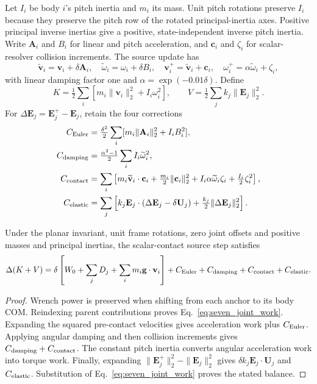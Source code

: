 Let $I_i$ be body $i$'s pitch inertia and $m_i$ its mass.
Unit pitch rotations preserve $I_i$ because they preserve the pitch row of the rotated principal-inertia axes.
Positive principal inverse inertias give a positive, state-independent inverse pitch inertia.
Write $\mathbf A_i$ and $B_i$ for linear and pitch acceleration, and $\mathbf c_i$ and $\zeta_i$ for scalar-resolver collision increments.
The source update has
\begin{equation}
 \widetilde{\mathbf v}_i=\mathbf v_i+\delta\mathbf A_i,\quad
 \widetilde\omega_i=\omega_i+\delta B_i,\quad
 \mathbf v_i^+=\widetilde{\mathbf v}_i+\mathbf c_i,\quad
 \omega_i^+=\alpha\widetilde\omega_i+\zeta_i,
\end{equation}
with linear damping factor one and $\alpha=\exp(-0.01\delta)$.
Define
\begin{equation}
 K=\tfrac12\sum_i[m_i\|\mathbf v_i\|_2^2+I_i\omega_i^2],
 \qquad V=\tfrac12\sum_jk_j\|\mathbf E_j\|_2^2.
\end{equation}
For $\Delta\mathbf E_j=\mathbf E_j^+-\mathbf E_j$, retain the four corrections
\begin{align}
 C_{\rm Euler}&=\tfrac{\delta^2}{2}\sum_i[m_i\|\mathbf A_i\|_2^2+I_iB_i^2],\nonumber\\
 C_{\rm damping}&=\tfrac{\alpha^2-1}{2}\sum_iI_i\widetilde\omega_i^2,\nonumber\\
 C_{\rm contact}&=\sum_i\left[
 m_i\widetilde{\mathbf v}_i\cdot\mathbf c_i+\tfrac{m_i}{2}\|\mathbf c_i\|_2^2+
 I_i\alpha\widetilde\omega_i\zeta_i+\tfrac{I_i}{2}\zeta_i^2\right],\nonumber\\
 C_{\rm elastic}&=\sum_j\left[
 k_j\mathbf E_j\cdot(\Delta\mathbf E_j-\delta\mathbf U_j)+
 \tfrac{k_j}{2}\|\Delta\mathbf E_j\|_2^2\right].
 \label{eq:source_energy_corrections}
\end{align}

\begin{proposition}
\label{prop:source_energy}
Under the planar invariant, unit frame rotations, zero joint offsets and positive masses and principal inertias, the scalar-contact source step satisfies
\begin{equation}
 \Delta(K+V)=\delta\left[W_0+\sum_jD_j+\sum_im_i\mathbf g\cdot\mathbf v_i\right]
 +C_{\rm Euler}+C_{\rm damping}+C_{\rm contact}+C_{\rm elastic}.
 \label{eq:source_mechanical_balance}
\end{equation}
\end{proposition}

\begin{proof}
Wrench power is preserved when shifting from each anchor to its body COM.
Reindexing parent contributions proves Eq.~\eqref{eq:seven_joint_work}.
Expanding the squared pre-contact velocities gives acceleration work plus $C_{\rm Euler}$.
Applying angular damping and then collision increments gives $C_{\rm damping}+C_{\rm contact}$.
The constant pitch inertia converts angular acceleration work into torque work.
Finally, expanding $\|\mathbf E_j^+\|_2^2-\|\mathbf E_j\|_2^2$ gives $\delta k_j\mathbf E_j\cdot\mathbf U_j$ and $C_{\rm elastic}$.
Substitution of Eq.~\eqref{eq:seven_joint_work} proves the stated balance.
\end{proof}

